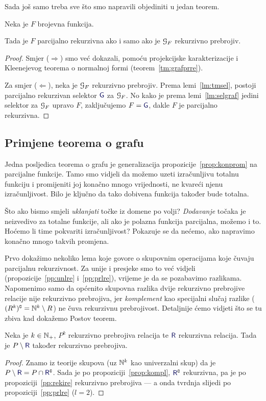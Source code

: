 Sada još samo treba sve što smo napravili objediniti u jedan teorem.

\begin{teorem}\label{tm:graf}
Neka je $F$ brojevna funkcija.

Tada je $F$ parcijalno rekurzivna ako i samo ako je $\mathcal G_{F}$ rekurzivno prebrojiv.
\end{teorem}
\begin{proof}
Smjer ($\Rightarrow$) smo već dokazali, pomoću projekcijske karakterizacije i Kleenejevog teorema o normalnoj formi (teorem~\ref{tm:grafprre}).

Za smjer ($\Leftarrow$), neka je $\mathcal G_{F}$ rekurzivno prebrojiv. Prema lemi~\ref{lm:tmsel}, postoji parcijalno rekurzivan selektor $\f G$ za $\mathcal G_{F}$. No kako je prema lemi~\ref{lm:selgraf} jedini selektor za $\mathcal G_{F}$ upravo $F$, zaključujemo $F=\f G$, dakle $F$ je parcijalno rekurzivna.
\end{proof}

\subsection{Primjene teorema o grafu}

Jedna posljedica teorema o grafu je generalizacija propozicije~\ref{prop:konprom} na parcijalne funkcije. Tamo smo vidjeli da možemo uzeti izračunljivu totalnu funkciju i promijeniti joj konačno mnogo vrijednosti, ne kvareći njenu izračunljivost. Bilo je ključno da tako dobivena funkcija također bude totalna.

Što ako bismo smjeli \emph{uklanjati} točke iz domene po volji? \emph{Dodavanje} točaka je neizvedivo za totalne funkcije, ali ako je polazna funkcija parcijalna, možemo i to. Hoćemo li time pokvariti izračunljivost? Pokazuje se da nećemo, ako napravimo konačno mnogo takvih promjena.

Prvo dokažimo nekoliko lema koje govore o skupovnim operacijama koje čuvaju parcijalnu rekurzivnost. Za unije i presjeke smo to već vidjeli (propozicije~\ref{pp:unlre} i~\ref{pp:prlre}), vrijeme je da se pozabavimo razlikama. Napomenimo samo da općenito skupovna razlika dvije rekurzivno prebrojive relacije nije rekurzivno prebrojiva, jer \emph{komplement} kao specijalni slučaj razlike ($(R^k)\sp{{\scriptscriptstyle\complement}}={\mathbb N}^k\setminus R$) ne čuva rekurzivnu prebrojivost. Detaljnije ćemo vidjeti što se tu zbiva kad dokažemo Postov teorem.

\begin{lema}[{name=[rekurzivna prebrojivost razlike s rekurzivnom relacijom]}]\label{lm:re-rek}
Neka je $k\in{\mathbb N}_+$, $P^k$ rekurzivno prebrojiva relacija te $\f R$ rekurzivna relacija. Tada je $P\setminus\f R$ također rekurzivno prebrojiva.
\end{lema}
\begin{proof}
    Znamo iz teorije skupova (uz ${\mathbb N}^k$ kao univerzalni skup) da je $P\setminus\f R=P\cap\f R\kompl$. Sada je po propoziciji~\ref{prop:kompl}, $\f R\kompl$ rekurzivna, pa je po propoziciji~\ref{pp:rekire} rekurzivno prebrojiva --- a onda tvrdnja slijedi po propoziciji~\ref{pp:prlre} ($l=2$).
\end{proof}

